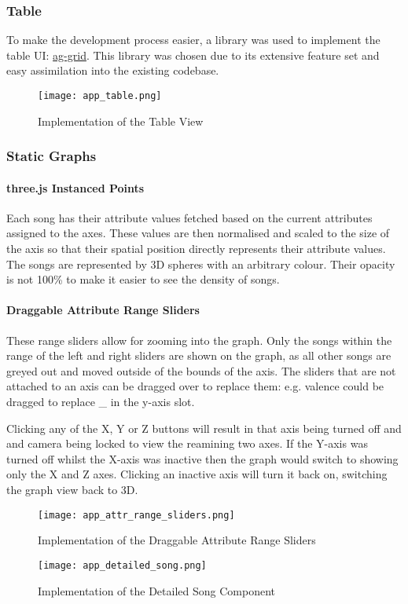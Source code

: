 \subsubsection{Table}
To make the development process easier, a library was used to implement the table UI: \href{https://www.ag-grid.com/react-data-grid/}{ag-grid}. This library was chosen due to its extensive feature set and easy assimilation into the existing codebase.
\begin{figure}[h]
    \centering
    \texttt{[image: app\_table.png]}
    \caption{Implementation of the Table View}
\end{figure}

\subsubsection{Static Graphs}%
\paragraph{three.js Instanced Points}
Each song has their attribute values fetched based on the current attributes assigned to the axes. These values are then normalised and scaled to the size of the axis so that their spatial position directly represents their attribute values. The songs are represented by 3D spheres with an arbitrary colour. Their opacity is not 100\% to make it easier to see the density of songs.

\paragraph{Draggable Attribute Range Sliders}
These range sliders allow for zooming into the graph. Only the songs within the range of the left and right sliders are shown on the graph, as all other songs are greyed out and moved outside of the bounds of the axis. The sliders that are not attached to an axis can be dragged over to replace them: e.g. valence could be dragged to replace \_ in the y-axis slot.

Clicking any of the X, Y or Z buttons will result in that axis being turned off and and camera being locked to view the reamining two axes. If the Y-axis was turned off whilst the X-axis was inactive then the graph would switch to showing only the X and Z axes. Clicking an inactive axis will turn it back on, switching the graph view back to 3D.
\begin{figure}[h]
    \centering
    \texttt{[image: app\_attr\_range\_sliders.png]}
    \caption{Implementation of the Draggable Attribute Range Sliders}
\end{figure}
\begin{figure}[h]
    \centering
    \texttt{[image: app\_detailed\_song.png]}
    \caption{Implementation of the Detailed Song Component}
\end{figure}

